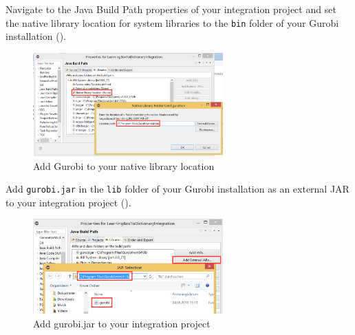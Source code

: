 \begin{stepbystep}
\item Navigate to the Java Build Path properties of your integration project and set the native library location for system libraries to the \texttt{bin} folder of your Gurobi installation ().

\begin{figure}[htbp]
\renewcommand\figurename{Figure}
\begin{center}
\includegraphics[width=0.65\textwidth]{../../org.moflon.doc.handbook.04_tripleGraphTransformations/8_consistencyChecking/images/nativeLibrary.png}
\caption{Add Gurobi to your native library location}
\label{eclipse:gurobiNative}
\end{center}
\end{figure}

\item Add \texttt{gurobi.jar} in the \texttt{lib} folder of your Gurobi installation as an external JAR to your integration project ().

\begin{figure}[htbp]
\renewcommand\figurename{Figure}
\begin{center}
\includegraphics[width=0.65\textwidth]{../../org.moflon.doc.handbook.04_tripleGraphTransformations/8_consistencyChecking/images/externalJar.png}
\caption{Add gurobi.jar to your integration project}
\label{eclipse:externalJar}
\end{center}
\end{figure}
\end{stepbystep}

